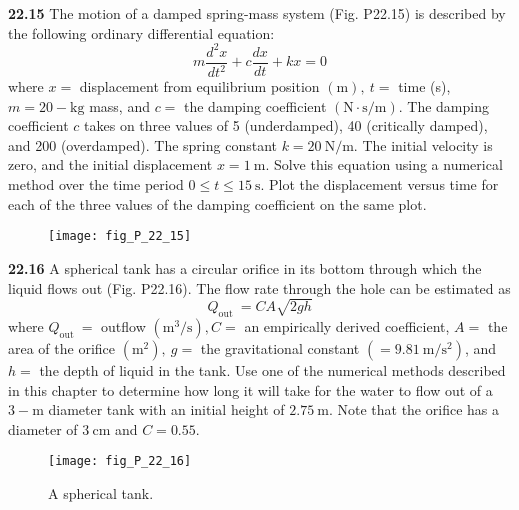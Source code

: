     \begin{multicols}{2}

    \noindent\textbf{22.15} The motion of a damped spring-mass system (Fig. P22.15) is described by the following ordinary differential equation:
    $$
    m \frac{d^{2} x}{d t^{2}}+c \frac{d x}{d t}+k x=0
    $$
    where $x=$ displacement from equilibrium position $(\mathrm{m}),\ t=$ time (s), $m=20-\mathrm{kg}$ mass, and $c=$ the damping coefficient $(\mathrm{N} \cdot \mathrm{s} / \mathrm{m})$. The damping coefficient $c$ takes on three values of 5 (underdamped), 40 (critically damped), and 200 (overdamped). The spring constant $k=20 \mathrm{~N} / \mathrm{m}$.
    The initial velocity is zero, and the initial displacement $x=1 \mathrm{~m}$. Solve this equation using a numerical method over the time period $0 \leq t \leq 15 \mathrm{~s}$. Plot the displacement versus time for each of the three values of the damping coefficient on the same plot.
    
    \begin{figure}[H]
        \centering
        \texttt{[image: fig\_P\_22\_15]}
        \caption{\textsf{}}
        \label{fig:fig_P_22_15}
    \end{figure}\vspace{2mm}

    \noindent\textbf{22.16} A spherical tank has a circular orifice in its bottom through which the liquid flows out (Fig. P22.16). The flow rate through the hole can be estimated as
    $$
    Q_{\text {out }}=C A \sqrt{2 g h}
    $$
    where $Q_{\text {out }}=$ outflow $\left(\mathrm{m}^{3} / \mathrm{s}\right), C=$ an empirically derived coefficient, $A=$ the area of the orifice $\left(\mathrm{m}^{2}\right),\ g=$ the gravitational constant $\left(=9.81 \mathrm{~m} / \mathrm{s}^{2}\right)$, and $h=$ the depth of liquid in the tank.
    Use one of the numerical methods described in this chapter to determine how long it will take for the water to flow out of a $3-\mathrm{m}$ diameter tank with an initial height of $2.75 \mathrm{~m}$. Note that the orifice has a diameter of $3 \mathrm{~cm}$ and $C=0.55$.
    
    \begin{figure}[H]
        \centering
        \texttt{[image: fig\_P\_22\_16]}
       \caption{\textsf{A spherical tank.}}\label{fig:fig_P_22_16}
    \end{figure}\vspace{2mm}


\end{multicols}
